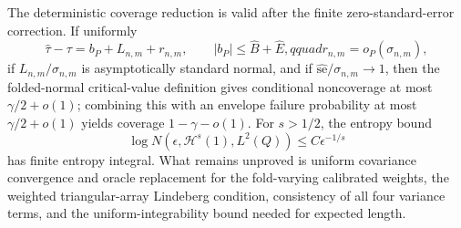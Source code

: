 The deterministic coverage reduction is valid after the finite zero-standard-error correction. If uniformly
\[
\widehat\tau-\tau=b_P+L_{n,m}+r_{n,m},\qquad |b_P|\le\widehat B+\widehat E,qquad r_{n,m}=o_P(\sigma_{n,m}),
\]
if \(L_{n,m}/\sigma_{n,m}\) is asymptotically standard normal, and if \(\widehat{\mathrm{se}}/\sigma_{n,m}\to1\), then the folded-normal critical-value definition gives conditional noncoverage at most \(\gamma/2+o(1)\); combining this with an envelope failure probability at most \(\gamma/2+o(1)\) yields coverage \(1-\gamma-o(1)\). For \(s>1/2\), the entropy bound
\[
\log N(\epsilon,\mathcal H^s(1),L^2(Q))\le C\epsilon^{-1/s}
\]
has finite entropy integral. What remains unproved is uniform covariance convergence and oracle replacement for the fold-varying calibrated weights, the weighted triangular-array Lindeberg condition, consistency of all four variance terms, and the uniform-integrability bound needed for expected length.